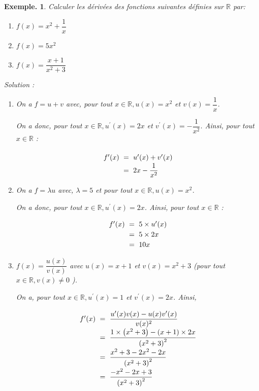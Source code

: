 \documentclass[12pt]{article}
\theoremstyle{break}
\newtheorem*{example}{Exemple.}
\begin{document}
\begin{example}
Calculer les dérivées des fonctions suivantes définies sur $\mathbb{R}$ par:

\begin{enumerate}
  \item $f(x)=x^{2}+\dfrac{1}{x}$
  \item $f(x)=5 x^{2}$
  \item $f(x)=\dfrac{x+1}{x^{2}+3}$
\end{enumerate}

Solution :
\begin{enumerate}
  \item On a $f=u+v$ avec, pour tout $x \in \mathbb{R}, u(x)=x^{2}$ et $v(x)=\dfrac{1}{x}$.
  
  On a donc, pour tout $x \in \mathbb{R}, u^{\prime}(x)=2 x$ et $v^{\prime}(x)=-\dfrac{1}{x^{2}}$. Ainsi, pour tout $x \in \mathbb{R}$ :

\begin{equation*}\arraycolsep=3pt\def\arraystretch{1.5}
  \begin{array}{rcl}
  f^{\prime}(x) & = & u^{\prime}(x)+v^{\prime}(x) \\
  & = & 2 x-\dfrac{1}{x^{2}}
  \end{array}
\end{equation*}

  \item On a $f=\lambda u$ avec, $\lambda=5$ et pour tout $x \in \mathbb{R}, u(x)=x^{2}$.

  On a donc, pour tout $x \in \mathbb{R}, u^{\prime}(x)=2 x$. Ainsi, pour tout $x \in \mathbb{R}$ :

\begin{equation*}\arraycolsep=3pt\def\arraystretch{1.2}
  \begin{array}{rcl}
  f^{\prime}(x) & = & 5 \times u^{\prime}(x) \\
  & = & 5 \times 2 x \\
  & = & 10 x
  \end{array}
\end{equation*}
  \item $f(x)=\dfrac{u(x)}{v(x)}$ avec $u(x)=x+1$ et $v(x)=x^{2}+3$ (pour tout $x \in \mathbb{R}, v(x) \neq 0$ ).

  On a, pour tout $x \in \mathbb{R}, u^{\prime}(x)=1$ et $v^{\prime}(x)=2 x$. Ainsi,

\begin{equation*}\arraycolsep=3pt\def\arraystretch{2}
  \begin{array}{rcl}
  f^{\prime}(x) & = & \dfrac{u^{\prime}(x) v(x)-u(x) v^{\prime}(x)}{v(x)^{2}} \\
  & = & \dfrac{1 \times\left(x^{2}+3\right)-(x+1) \times 2 x}{\left(x^{2}+3\right)^{2}} \\
  & = & \dfrac{x^{2}+3-2 x^{2}-2 x}{\left(x^{2}+3\right)^{2}} \\
  & = & \dfrac{-x^{2}-2 x+3}{\left(x^{2}+3\right)^{2}}
  \end{array}
\end{equation*}
\end{enumerate}
\end{example}
\end{document}
